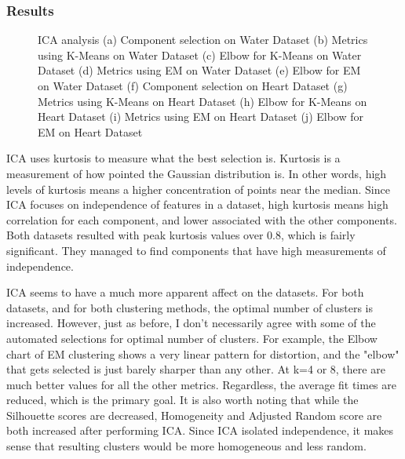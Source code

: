 \documentclass[
	letterpaper, %
]{mlreport}
\begin{document}
\subsubsection{Results}
\begin{figure}
	\centering
	\caption{ICA analysis (a) Component selection on Water Dataset (b) Metrics using K-Means on Water Dataset (c) Elbow for K-Means on Water Dataset (d) Metrics using EM on Water Dataset (e) Elbow for EM on Water Dataset (f) Component selection on Heart Dataset (g) Metrics using K-Means on Heart Dataset (h) Elbow for K-Means on Heart Dataset (i) Metrics using EM on Heart Dataset (j) Elbow for EM on Heart Dataset}
	\label{fig:fig4}
\end{figure}

ICA uses kurtosis to measure what the best selection is. Kurtosis is a measurement of how pointed the Gaussian distribution is. In other words, high levels of kurtosis means a higher concentration of points near the median. Since ICA focuses on independence of features in a dataset, high kurtosis means high correlation for each component, and lower associated with the other components. Both datasets resulted with peak kurtosis values over 0.8, which is fairly significant. They managed to find components that have high measurements of independence.

ICA seems to have a much more apparent affect on the datasets. For both datasets, and for both clustering methods, the optimal number of clusters is increased. However, just as before, I don't necessarily agree with some of the automated selections for optimal number of clusters. For example, the Elbow chart of EM clustering shows a very linear pattern for distortion, and the "elbow" that gets selected is just barely sharper than any other. At k=4 or 8, there are much better values for all the other metrics. Regardless, the average fit times are reduced, which is the primary goal. It is also worth noting that while the Silhouette scores are decreased, Homogeneity and Adjusted Random score are both increased after performing ICA. Since ICA isolated independence, it makes sense that resulting clusters would be more homogeneous and less random.
\end{document}
